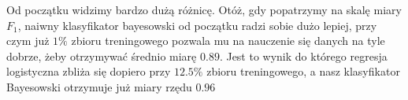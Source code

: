 \documentclass[polish,12pt,a4paper]{extarticle}
\begin{document}
Od początku widzimy bardzo dużą różnicę. Otóż, gdy popatrzymy na skalę miary $F_1$, naiwny klasyfikator bayesowski od początku radzi sobie dużo lepiej, przy czym już $1\%$ zbioru treningowego pozwala mu na nauczenie się danych na tyle dobrze, żeby otrzymywać średnio miarę $0.89$. Jest to wynik do którego regresja logistyczna zbliża się dopiero przy $12.5\%$ zbioru treningowego, a nasz klasyfikator Bayesowski otrzymuje już miary rzędu $0.96$
\end{document}
